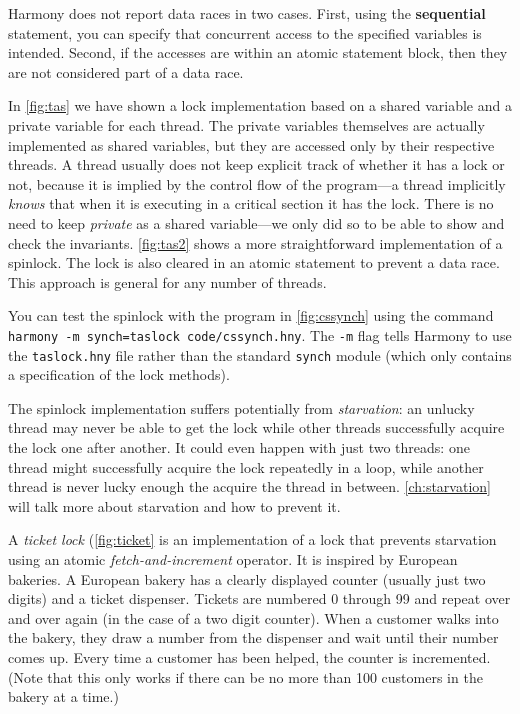 \documentclass{report}
\begin{document}
Harmony does not report data races in two cases.
First, using the \textbf{sequential} statement, you can specify that
concurrent access to the specified variables is intended.
Second, if the accesses are within an atomic statement block, then they
are not considered part of a data race.

In \autoref{fig:tas} we have shown a lock implementation based on a shared
variable and a private variable for each thread.   The private
variables themselves are actually implemented as shared variables,
but they are accessed only by their respective threads.
A thread usually does not keep explicit track of whether it has a lock
or not, because it is implied by the control flow of the program---a
thread implicitly \emph{knows} that when it is executing in a critical
section it has the lock.
There is no need to keep \textit{private} as a shared
variable---we only did so to be able to show and check the invariants.
\autoref{fig:tas2} shows a more straightforward implementation of a spinlock.
The lock is also cleared in an atomic statement to prevent a data race.
This approach is general for any number of threads.

You can test the spinlock with the program in \autoref{fig:cssynch}
using the command \texttt{harmony -m synch=taslock code/cssynch.hny}.
The \texttt{-m} flag tells Harmony to use the \texttt{taslock.hny} file
rather than the standard \texttt{synch} module (which only contains
a specification of the lock methods).

%
The spinlock implementation suffers potentially from \emph{starvation}:
an unlucky thread may never be able to get the lock while other threads
successfully acquire the lock one after another.  It could even happen
with just two threads: one thread might successfully acquire the lock
repeatedly in a loop, while another thread is never lucky enough the
acquire the thread in between.
\autoref{ch:starvation} will talk more about starvation and how
to prevent it.

A \emph{ticket lock} (\autoref{fig:ticket} is an implementation of a
lock that prevents starvation using an atomic \emph{fetch-and-increment}
operator.  It is inspired by European bakeries.  A European bakery has a
clearly displayed counter (usually just two digits) and a ticket dispenser.
Tickets are numbered 0 through 99 and repeat over and over again
(in the case of a two digit counter).
When a customer walks into the bakery, they draw a number from the dispenser
and wait until their number comes up.
Every time a customer has been helped, the counter is incremented.
(Note that this only works if there can be no more than 100 customers in
the bakery at a time.)
\end{document}
